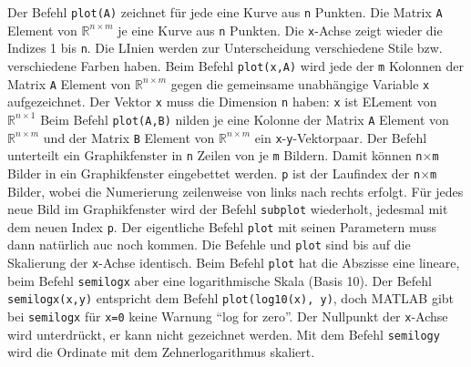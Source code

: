 \newline\newline
Der Befehl {\color{red}\texttt{plot(A)}} zeichnet für jede eine Kurve aus \texttt{n} Punkten. Die Matrix \texttt{A} Element von \texttt{$\mathbb{R}^{n\times m}$} je eine Kurve aus \texttt{n} Punkten. Die \texttt{x}-Achse zeigt wieder die Indizes 1 bis \texttt{n}. Die LInien werden zur Unterscheidung verschiedene Stile bzw. verschiedene Farben haben.
\newline\newline
Beim Befehl {\color{red}\texttt{plot(x,A)}} wird jede der \texttt{m} Kolonnen der Matrix \texttt{A} Element von \texttt{$\mathbb{R}^{n\times m}$} gegen die gemeinsame unabhängige Variable \texttt{x} aufgezeichnet. Der Vektor \texttt{x} muss die Dimension \texttt{n} haben: \texttt{x} ist ELement von \texttt{$\mathbb{R}^{n\times 1}$}
\newline\newline
Beim Befehl {\color{red}\texttt{plot(A,B)}} nilden je eine Kolonne der Matrix \texttt{A} Element von \texttt{$\mathbb{R}^{n\times m}$} und der Matrix \texttt{B} Element von \texttt{$\mathbb{R}^{n\times m}$} ein \texttt{x}-\texttt{y}-Vektorpaar.
\newline\newline
Der Befehl  unterteilt ein Graphikfenster in \texttt{n} Zeilen von je \texttt{m} Bildern. Damit können \texttt{n$\times$m} Bilder in ein Graphikfenster eingebettet werden. \texttt{p} ist der Laufindex der \texttt{n$\times$m} Bilder, wobei die Numerierung zeilenweise von links nach rechts erfolgt. Für jedes neue Bild im Graphikfenster wird der Befehl \texttt{subplot} wiederholt, jedesmal mit dem neuen Index \texttt{p}. Der eigentliche Befehl \texttt{plot} mit seinen Parametern muss dann natürlich auc noch kommen.
\newline\newline
Die Befehle  und {\color{red}\texttt{plot}} sind bis auf die Skalierung der \texttt{x}-Achse identisch. Beim Befehl {\color{red}\texttt{plot}} hat die Abszisse eine lineare, beim Befehl \texttt{semilogx} aber eine logarithmische Skala (Basis 10). Der Befehl {\color{red}\texttt{semilogx(x,y)}} entspricht dem Befehl {\color{red}\texttt{plot(log10(x), y)}}, doch MATLAB gibt bei \texttt{semilogx} für \texttt{x=0} keine Warnung ``log for zero''. Der Nullpunkt der \texttt{x}-Achse wird unterdrückt, er kann nicht gezeichnet werden. Mit dem Befehl {\color{red}\texttt{semilogy}} wird die Ordinate mit dem Zehnerlogarithmus skaliert.
